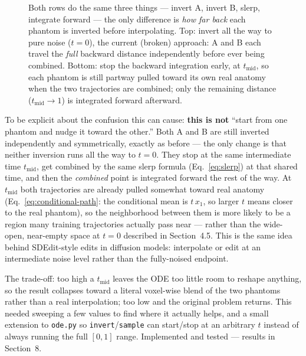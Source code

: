 \documentclass[11pt]{article}
\begin{document}
\begin{figure}[h]
{%
}
\caption{Both rows do the same three things --- invert A, invert B, slerp, integrate forward
--- the only difference is \emph{how far back} each phantom is inverted before interpolating.
Top: invert all the way to pure noise ($t{=}0$), the current (broken) approach: A and B each
travel the \emph{full} backward distance independently before ever being combined. Bottom: stop
the backward integration early, at $t_{\text{mid}}$, so each phantom is still partway pulled
toward its own real anatomy when the two trajectories are combined; only the remaining
distance ($t_{\text{mid}}\to 1$) is integrated forward afterward.}
\label{fig:tmid}
\end{figure}

To be explicit about the confusion this can cause: \textbf{this is not} ``start from one
phantom and nudge it toward the other.'' Both A and B are still inverted independently and
symmetrically, exactly as before --- the only change is that neither inversion runs all the
way to $t=0$. They stop at the same intermediate time $t_{\text{mid}}$, get combined by the
same slerp formula (Eq.~\eqref{eq:slerp}) at that shared time, and then the \emph{combined}
point is integrated forward the rest of the way. At $t_{\text{mid}}$ both trajectories are
already pulled somewhat toward real anatomy (Eq.~\eqref{eq:conditional-path}: the conditional
mean is $t\,x_1$, so larger $t$ means closer to the real phantom), so the neighborhood between
them is more likely to be a region many training trajectories actually pass near --- rather
than the wide-open, near-empty space at $t=0$ described in Section~4.5. This is the same idea
behind SDEdit-style edits in diffusion models: interpolate or edit at an intermediate noise
level rather than the fully-noised endpoint.

The trade-off: too high a $t_{\text{mid}}$ leaves the ODE too little room to reshape anything,
so the result collapses toward a literal voxel-wise blend of the two phantoms rather than a
real interpolation; too low and the original problem returns. This needed sweeping a few
values to find where it actually helps, and a small extension to \texttt{ode.py} so
\texttt{invert}/\texttt{sample} can start/stop at an arbitrary $t$ instead of always running
the full $[0,1]$ range. Implemented and tested --- results in Section~8.
\end{document}
